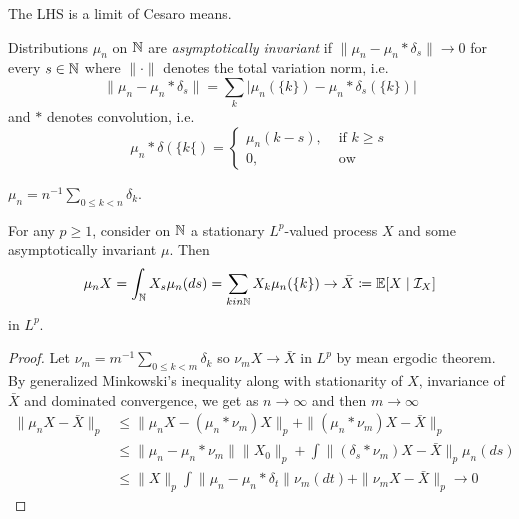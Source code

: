 The LHS is a limit of Cesaro means.

\begin{definition}
  Distributions $\mu_n$ on $\mathbb{N}$ are \emph{asymptotically invariant}
  if $\|\mu_n - \mu_n \ast \delta_s \| \to 0$ for every $s \in \mathbb{N}$
  where $\|\cdot\|$ denotes the total variation norm, i.e.
  \[
    \|\mu_n - \mu_n \ast \delta_s\|
    = \sum_k \lvert \mu_n(\{k\}) - \mu_n \ast \delta_s(\{k\}) \rvert
  \]
  and $\ast$ denotes convolution, i.e.
  \[
    \mu_n \ast \delta(\{k\{) = \begin{cases}
          \mu_n(k-s), &\text{ if }k \geq s\\
          0, &\text{ ow}
    \end{cases}
  \]
\end{definition}

\begin{example}
  $\mu_n = n^{-1} \sum_{0 \leq k < n} \delta_k$.
\end{example}

\begin{corollary}
  For any $p \geq 1$, consider on $\mathbb{N}$ a stationary
  $L^p$-valued process $X$ and some asymptotically invariant $\mu$.
  Then
  \[
    \mu_n X = \int_{\mathbb{N}} X_s \mu_n(ds) = \sum_{k in \mathbb{N}} X_k \mu_n(\{k\})
    \to \bar{X} \coloneqq \mathbb{E}[X \mid \mathcal{I}_X]
  \]
  in $L^p$.
\end{corollary}

\begin{proof}
  Let $\nu_m = m^{-1} \sum_{0 \leq k < m} \delta_k$
  so $\nu_m X \to \bar{X}$ in $L^p$ by mean ergodic theorem.
  By generalized Minkowski's inequality along with stationarity of $X$,
  invariance of $\bar{X}$ and dominated convergence, we get as $n \to \infty$
  and then $m \to \infty$
  \begin{align*}
    \|\mu_n X - \bar{X}\|_p
    &\leq \|\mu_n X - (\mu_n \ast \nu_m) X \|_p
    + \|(\mu_n \ast \nu_m) X - \bar{X}\|_p \\
    &\leq \|\mu_n - \mu_n \ast \nu_m\| \|X_0\|_p
    + \int \|(\delta_s \ast \nu_m) X - \bar{X}\|_p \mu_n(ds) \\
    &\leq \|X\|_p \int \|\mu_n - \mu_n \ast \delta_t\| \nu_m(dt)
    + \|\nu_m X - \bar{X}\|_p \to 0
  \end{align*}
\end{proof}
